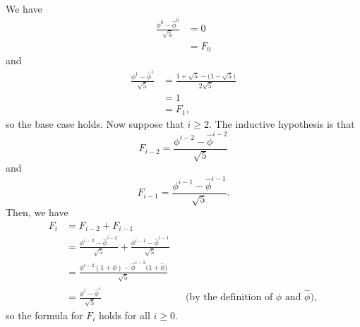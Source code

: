 We have
\begin{align*}
    \frac{\phi^0-\widehat\phi^0}{\sqrt{5}} &= 0 \\
    &= F_0
\end{align*}
and
\begin{align*}
    \frac{\phi^1-\widehat\phi^1}{\sqrt{5}} &= \frac{1+\!\sqrt{5}-\bigl(1-\!\sqrt{5}\bigr)}{2\!\sqrt{5}} \\
    &= 1 \\
    &= F_1,
\end{align*}
so the base case holds.
Now suppose that $i\ge2$.
The inductive hypothesis is that
\[
    F_{i-2} = \frac{\phi^{i-2}-\widehat\phi^{i-2}}{\sqrt{5}}
\]
and
\[
    F_{i-1} = \frac{\phi^{i-1}-\widehat\phi^{i-1}}{\sqrt{5}}.
\]
Then, we have
\begin{align*}
    F_i &= F_{i-2}+F_{i-1} \\[1mm]
    &= \frac{\phi^{i-2}-\widehat\phi^{i-2}}{\sqrt{5}}+\frac{\phi^{i-1}-\widehat\phi^{i-1}}{\sqrt{5}} \\[1mm]
    &= \frac{\phi^{i-2}(1+\phi)-\widehat\phi^{i-2}\bigl(1+\widehat\phi\bigr)}{\sqrt{5}} \\
    &= \frac{\phi^i-\widehat\phi^i}{\sqrt{5}} && \text{(by the definition of $\phi$ and $\widehat\phi$)},
\end{align*}
so the formula for $F_i$ holds for all $i\ge0$.
